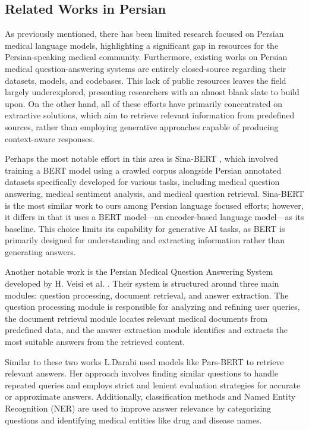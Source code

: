 \documentclass[conference]{IEEEtran}
\begin{document}
	\subsection{Related Works in Persian}
	As previously mentioned, there has been limited research focused on Persian medical language models, highlighting a significant gap in resources for the Persian-speaking medical community. Furthermore, existing works on Persian medical question-answering systems are entirely closed-source regarding their datasets, models, and codebases. This lack of public resources leaves the field largely underexplored, presenting researchers with an almost blank slate to build upon. On the other hand, all of these efforts have primarily concentrated on extractive solutions, which aim to retrieve relevant information from predefined sources, rather than employing generative approaches capable of producing context-aware responses.
	
	Perhaps the most notable effort in this area is Sina-BERT \cite{b4}, which involved training a BERT model \cite{b11}
	 using a crawled corpus alongside Persian annotated datasets specifically developed for various tasks, including medical question answering, medical sentiment analysis, and medical question retrieval. Sina-BERT is the most similar work to ours among Persian language focused efforts; however, it differs in that it uses a BERT model—an encoder-based language model—as its baseline. This choice limits its capability for generative AI tasks, as BERT is primarily designed for understanding and extracting information rather than generating answers.
	
	Another notable work is the Persian Medical Question Answering System developed by H. Veisi et al.
	\cite{b12}.
	Their system is structured around three main modules: question processing, document retrieval, and answer extraction. The question processing module is responsible for analyzing and refining user queries, the document retrieval module locates relevant medical documents from predefined data, and the answer extraction module identifies and extracts the most suitable answers from the retrieved content.
	
	Similar to these two works L.Darabi
	\cite{b13}
	used models like Pars-BERT
	\cite{b14}
	to retrieve relevant answers. Her approach involves finding similar questions to handle repeated queries and employs strict and lenient evaluation strategies for accurate or approximate answers. Additionally, classification methods and Named Entity Recognition (NER) are used to improve answer relevance by categorizing questions and identifying medical entities like drug and disease names.
	
\end{document}
